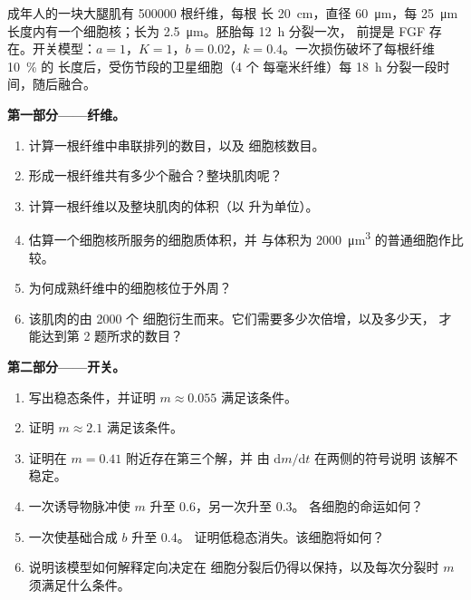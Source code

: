 \begin{problem}
\label{pb:b2:cell-differentiation:1}
成年人的一块大腿肌有 \num{500000} 根纤维，每根
长 \qty{20}{cm}，直径 \qty{60}{\micro m}，每
\qty{25}{\micro m} 长度内有一个细胞核；长为
\qty{2.5}{\micro m}。胚胎每 \qty{12}{h} 分裂一次，
前提是 FGF 存在。开关模型：$a = 1$，$K = 1$，$b = 0.02$，$k
= 0.4$。一次损伤破坏了每根纤维 \qty{10}{\%} 的
长度后，受伤节段的卫星细胞（\num{4} 个
每毫米纤维）每 \qty{18}{h} 分裂一段时间，随后融合。

\medskip
\noindent\textbf{第一部分——纤维。}
\begin{enumerate}
  \item 计算一根纤维中串联排列的数目，以及
        细胞核数目。
  \item 形成一根纤维共有多少个融合？整块肌肉呢？
  \item 计算一根纤维以及整块肌肉的体积（以
        升为单位）。
  \item 估算一个细胞核所服务的细胞质体积，并
        与体积为 \qty{2000}{\micro m^3} 的普通细胞作比较。
  \item 为何成熟纤维中的细胞核位于外周？
  \item 该肌肉的由 \num{2000} 个
        细胞衍生而来。它们需要多少次倍增，以及多少天，
        才能达到第 2 题所求的数目？
\end{enumerate}

\medskip
\noindent\textbf{第二部分——开关。}
\begin{enumerate}[resume]
  \item 写出稳态条件，并证明 $m \approx
        0.055$ 满足该条件。
  \item 证明 $m \approx 2.1$ 满足该条件。
  \item 证明在 $m = 0.41$ 附近存在第三个解，并
        由 $\mathrm{d}m/\mathrm{d}t$ 在两侧的符号说明
        该解不稳定。
  \item 一次诱导物脉冲使 $m$ 升至 $0.6$，另一次升至 $0.3$。
        各细胞的命运如何？
  \item 一次使基础合成 $b$ 升至 $0.4$。
        证明低稳态消失。该细胞将如何？
  \item 说明该模型如何解释定向决定在
        细胞分裂后仍得以保持，以及每次分裂时 $m$ 须满足什么条件。
\end{enumerate}


\end{problem}
